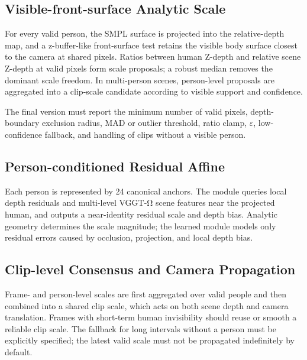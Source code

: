 \subsection{Visible-front-surface Analytic Scale}

For every valid person, the SMPL surface is projected into the relative-depth map, and a z-buffer-like front-surface test retains the visible body surface closest to the camera at shared pixels. Ratios between human Z-depth and relative scene Z-depth at valid pixels form scale proposals; a robust median removes the dominant scale freedom. In multi-person scenes, person-level proposals are aggregated into a clip-scale candidate according to visible support and confidence.

The final version must report the minimum number of valid pixels, depth-boundary exclusion radius, MAD or outlier threshold, ratio clamp, $\varepsilon$, low-confidence fallback, and handling of clips without a visible person.

\subsection{Person-conditioned Residual Affine}

Each person is represented by 24 canonical anchors. The module queries local depth residuals and multi-level VGGT-Ω scene features near the projected human, and outputs a near-identity residual scale and depth bias. Analytic geometry determines the scale magnitude; the learned module models only residual errors caused by occlusion, projection, and local depth bias.


\subsection{Clip-level Consensus and Camera Propagation}

Frame- and person-level scales are first aggregated over valid people and then combined into a shared clip scale, which acts on both scene depth and camera translation. Frames with short-term human invisibility should reuse or smooth a reliable clip scale. The fallback for long intervals without a person must be explicitly specified; the latest valid scale must not be propagated indefinitely by default.

